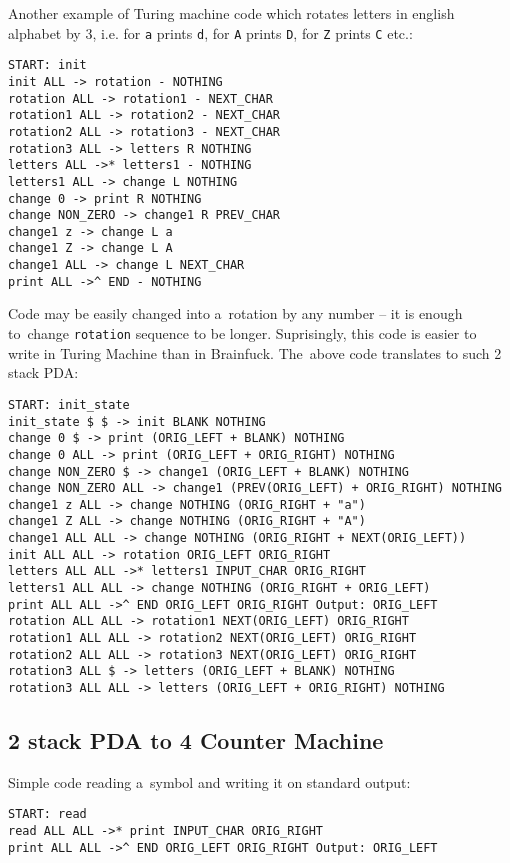 \documentclass[english,shortabstract,mgr]{iithesis}
\begin{document}
Another example of Turing machine code which rotates letters in english
alphabet by $3$, i.e. for \texttt{a} prints \texttt{d}, for \texttt{A}
prints \texttt{D}, for \texttt{Z} prints \texttt{C} etc.:

\begin{verbatim}
START: init
init ALL -> rotation - NOTHING
rotation ALL -> rotation1 - NEXT_CHAR
rotation1 ALL -> rotation2 - NEXT_CHAR
rotation2 ALL -> rotation3 - NEXT_CHAR
rotation3 ALL -> letters R NOTHING
letters ALL ->* letters1 - NOTHING
letters1 ALL -> change L NOTHING
change 0 -> print R NOTHING
change NON_ZERO -> change1 R PREV_CHAR
change1 z -> change L a
change1 Z -> change L A
change1 ALL -> change L NEXT_CHAR
print ALL ->^ END - NOTHING
\end{verbatim}

Code may be easily changed into a~rotation by any number -- it is enough
to~change \texttt{rotation} sequence to be longer. Suprisingly, this code
is easier to write in Turing Machine than in Brainfuck. The~above code
translates to such 2 stack PDA:

\begin{verbatim}
START: init_state
init_state $ $ -> init BLANK NOTHING
change 0 $ -> print (ORIG_LEFT + BLANK) NOTHING
change 0 ALL -> print (ORIG_LEFT + ORIG_RIGHT) NOTHING
change NON_ZERO $ -> change1 (ORIG_LEFT + BLANK) NOTHING
change NON_ZERO ALL -> change1 (PREV(ORIG_LEFT) + ORIG_RIGHT) NOTHING
change1 z ALL -> change NOTHING (ORIG_RIGHT + "a")
change1 Z ALL -> change NOTHING (ORIG_RIGHT + "A")
change1 ALL ALL -> change NOTHING (ORIG_RIGHT + NEXT(ORIG_LEFT))
init ALL ALL -> rotation ORIG_LEFT ORIG_RIGHT
letters ALL ALL ->* letters1 INPUT_CHAR ORIG_RIGHT
letters1 ALL ALL -> change NOTHING (ORIG_RIGHT + ORIG_LEFT)
print ALL ALL ->^ END ORIG_LEFT ORIG_RIGHT Output: ORIG_LEFT
rotation ALL ALL -> rotation1 NEXT(ORIG_LEFT) ORIG_RIGHT
rotation1 ALL ALL -> rotation2 NEXT(ORIG_LEFT) ORIG_RIGHT
rotation2 ALL ALL -> rotation3 NEXT(ORIG_LEFT) ORIG_RIGHT
rotation3 ALL $ -> letters (ORIG_LEFT + BLANK) NOTHING
rotation3 ALL ALL -> letters (ORIG_LEFT + ORIG_RIGHT) NOTHING
\end{verbatim}

\subsection{2 stack PDA to 4 Counter Machine}

Simple code reading a~symbol and writing it on standard output:

\begin{verbatim}
START: read
read ALL ALL ->* print INPUT_CHAR ORIG_RIGHT
print ALL ALL ->^ END ORIG_LEFT ORIG_RIGHT Output: ORIG_LEFT
\end{verbatim}
\end{document}
